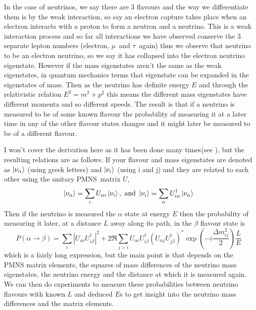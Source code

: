 \documentclass[a4paper,12pt]{article}
\newcommand{\Mu}{$\mu$}
\newcommand{\Tau}{$\tau$}
\begin{document}
In the case of neutrinos, we say there are 3 flavours and the way we differentiate them is by the weak interaction, so say an electron capture takes place when an electron interacts with a proton to form a neutron and a neutrino.
This is a weak interaction process and so far all interactions we have observed conserve the 3 separate lepton numbers (electron, \Mu\ and \Tau\ again) thus we observe that neutrino to be an electron neutrino, so we say it has collapsed into the electron neutrino eigenstate.
However if the mass eigenstates aren't the same as the weak eigenstates, in quantum mechanics terms that eigenstate can be expanded in the eigenstates of mass.
Then as the neutrino has definite energy $E$ and through the relativistic relation $E^2 = m^2 + p^2$ this means the different mass eigenstates have different momenta and so different speeds.
The result is that if a neutrino is measured to be of some known flavour the probability of measuring it at a later time in any of the other flavour states changes and it might later be measured to be of a different flavour.

I won't cover the derivation here as it has been done many times(see \cite{zuberNeutrinoPhysics2020}), but the resulting relations are as follows.
If your flavour and mass eigenstates are denoted as $\ket{\nu_\alpha}$ (using greek letters) and $\ket{\nu_i}$ (using i and j) and they are related to each other using the unitary PMNS\footnotemark\ matrix $U$,
\begin{equation}
    \ket{\nu_\alpha} = \sum_i U_{\alpha i} \ket{\nu_i}, \text{ and }
    \ket{\nu_i} = \sum_\alpha U^\dag_{i \alpha} \ket{\nu_\alpha}
\end{equation}
Then if the neutrino is measured the $\alpha$ state at energy $E$ then the probability of measuring it later, at a distance $L$ away along its path, in the $\beta$ flavour state is
\begin{equation}
    P(\alpha \rightarrow \beta) = \sum_i |U_{\alpha i} U^\dag_{i \beta}|^2 + 2\Re \sum_{j>i} U_{\alpha i} U^\dag_{i \beta} (U_{\alpha j} U^\dag_{j \beta})^* \exp(-i\frac{\Delta m^2_{ij}}{2})\frac{L}{E}
\end{equation}
which is a fairly long expression, but the main point is that depends on the PMNS matrix elements, the squares of mass differences of the neutrino mass eigenstates, the neutrino energy and the distance at which it is measured again.
We can then do experiments to measure these probabilities between neutrino flavours with known $L$ and deduced $E$s to get insight into the neutrino mass differences and the matrix elements.
\end{document}
